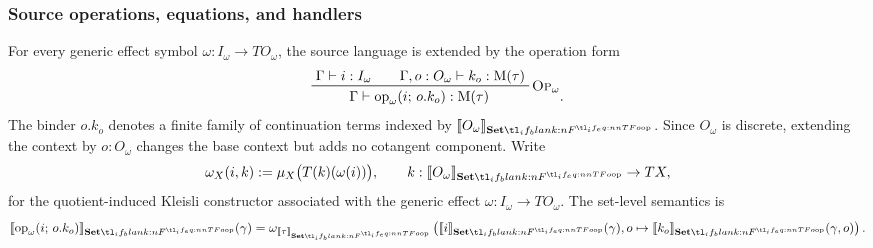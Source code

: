\documentclass[11pt,a4paper]{article}
\theoremstyle{definition}
\theoremstyle{remark}
\providecommand{\setint}[1]{\llbracket #1\rrbracket_{\Set}}
\begin{document}
\subsubsection{Source operations, equations, and handlers}

For every generic effect symbol \(\omega:I_{\omega}\to T O_{\omega}\), the
source language is extended by the operation form
\[
\prftree[r]{\textsc{Op}\(_\omega\)}{
  \Gamma\vdash i:I_{\omega}
  \qquad
  \Gamma,o:O_{\omega}\vdash k_o:\Fun[nn]{\opn[b]{M}}{\tau}
}{
  \Gamma\vdash
  \fn[n]{\opn[b]{op}_{\omega}}{i;\,o.k_o}
  :\Fun[nn]{\opn[b]{M}}{\tau}
}.
\]
The binder \(o.k_o\) denotes a finite family of continuation terms indexed by
\(\setint{O_{\omega}}\).  Since \(O_{\omega}\) is discrete, extending the context
by \(o:O_{\omega}\) changes the base context but adds no cotangent component.
Write
\[
  \omega_X(i,k)
  :=
  \mu_X\bigl(T(k)(\omega(i))\bigr),
  \qquad
  k:\setint{O_{\omega}}\to TX,
\]
for the quotient-induced Kleisli constructor associated with the generic effect
\(\omega:I_{\omega}\to T O_{\omega}\).  The set-level semantics is
\[
  \setint{\fn[n]{\opn[b]{op}_{\omega}}{i;\,o.k_o}}(\gamma)
  =
  \omega_{\setint{\tau}}
  \left(
    \setint{i}(\gamma),
    o\mapsto \setint{k_o}(\gamma,o)
  \right).
\]
\end{document}
